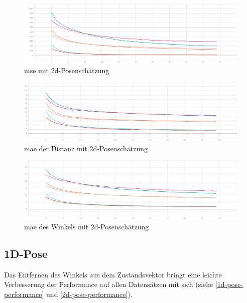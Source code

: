 \begin{figure}[H]
	\centering
	\includegraphics[width=\linewidth]{kapitel5/images//single-loss/Loss-single-loss.png}
	\caption{\acs{mse} mit \acs{2d}-Posenschätzung}
	\label{2d-poses-mse}
\end{figure}

\begin{figure}[H]
	\centering
	\includegraphics[width=\linewidth]{kapitel5/images/single-loss/Mean_Abs_Error_d-single-loss.png}
	\caption{\acs{mae} der Distanz mit \acs{2d}-Posenschätzung}
	\label{2d-poses-mae-d}
\end{figure}

\begin{figure}[H]
	\centering
	\includegraphics[width=\linewidth]{kapitel5/images/single-loss/Mean_Abs_Error_a-single-loss.png}
	\caption{\acs{mae} des Winkels mit \acs{2d}-Posenschätzung}
	\label{2d-poses-mae-a}
\end{figure}

\subsection{1D-Pose}

Das Entfernen des Winkels aus dem Zustandsvektor bringt eine leichte Verbesserung der Performance auf allen Datensätzen mit sich (siehe \ref{1d-pose-performance} und \ref{2d-pose-performance}). 

